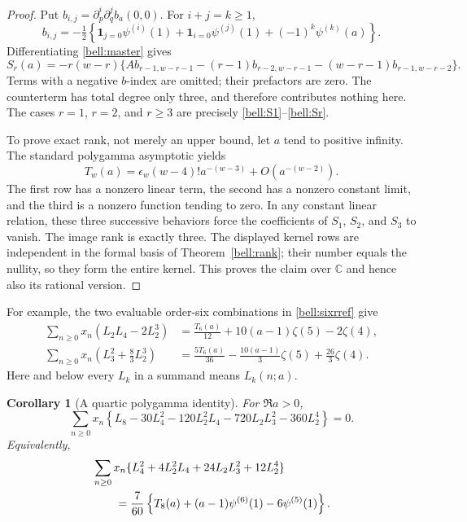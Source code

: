 \documentclass[11pt,a4paper]{article}
\numberwithin{equation}{section}
\newtheorem{corollary}[theorem]{Corollary}
\theoremstyle{definition}
\theoremstyle{remark}
\newcommand{\C}{\mathbb C}
\begin{document}
\begin{proof}
Put $b_{i,j}=\partial_p^i\partial_q^jb_a(0,0)$. For $i+j=k\ge1$,
\[
 b_{i,j}=-\tfrac12\left\{
 \mathbf1_{j=0}\psi^{(i)}(1)+\mathbf1_{i=0}\psi^{(j)}(1)
                     +(-1)^k\psi^{(k)}(a)\right\}.
\]
Differentiating \eqref{bell:master} gives
\[
 S_r(a)=-r(w-r)\{A b_{r-1,w-r-1}
 -(r-1)b_{r-2,w-r-1}-(w-r-1)b_{r-1,w-r-2}\}.
\]
Terms with a negative $b$-index are omitted; their prefactors are zero.
The counterterm has total degree only three, and therefore contributes
nothing here. The cases $r=1$, $r=2$, and $r\ge3$ are precisely
\eqref{bell:S1}--\eqref{bell:Sr}.

To prove exact rank, not merely an upper bound, let $a$ tend to positive
infinity. The standard polygamma asymptotic yields
\[
 T_w(a)=\epsilon_w(w-4)!a^{-(w-3)}+O(a^{-(w-2)}).
\]
The first row has a nonzero linear term, the second has a nonzero
constant limit, and the third is a nonzero function tending to zero.
In any constant linear relation, these three successive behaviors force
the coefficients of $S_1$, $S_2$, and $S_3$ to vanish. The image rank is
exactly three. The displayed kernel rows are independent in the formal
basis of Theorem~\ref{bell:rank}; their number equals the nullity, so
they form the entire kernel. This proves the claim over $\C$ and hence
also its rational version.
\end{proof}

For example, the two evaluable order-six combinations in
\eqref{bell:sixrref} give
\begin{align}
 \sum_{n\ge0}x_n(L_2L_4-2L_2^3)
 &=\frac{T_6(a)}{12}+10(a-1)\zeta(5)-2\zeta(4),\label{bell:sixidentity1}\\
 \sum_{n\ge0}x_n\left(L_3^2+\frac83L_2^3\right)
 &=\frac{5T_6(a)}{36}-\frac{10(a-1)}3\zeta(5)
                                    +\frac{26}3\zeta(4).
 \label{bell:sixidentity2}
\end{align}
Here and below every $L_k$ in a summand means $L_k(n;a)$.

\begin{corollary}[A quartic polygamma identity]
\label{bell:quartic}
For $\Re a>0$,
\begin{equation}
 \sum_{n\ge0}x_n\left\{
 L_8-30L_4^2-120L_2^2L_4-720L_2L_3^2-360L_2^4\right\}=0.
 \label{bell:quarticzero}
\end{equation}
Equivalently,
\begin{align}
 &\sum_{n\ge0}x_n\{L_4^2+4L_2^2L_4+24L_2L_3^2+12L_2^4\}\notag\\
 &\qquad=\frac7{60}\left\{T_8(a)+(a-1)\psi^{(6)}(1)
                                         -6\psi^{(5)}(1)\right\}.
 \label{bell:quarticvalue}
\end{align}
\end{corollary}
\end{document}
